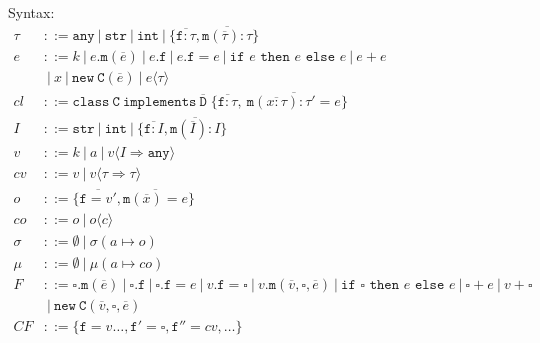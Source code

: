 \documentclass{report}
\begin{document}
\newcommand{\class}{\ensuremath{\xt{class}}\xspace}
\newcommand{\G}{\Gamma}
\renewcommand{\int}{\texttt{int}}
\newcommand{\coerce}{\Rightarrow} %
\newcommand{\str}{\texttt{str}}
\newcommand{\any}{\texttt{any}}   %
\newcommand{\this}{\texttt{this}}
\newcommand{\ifthenelse}[3]{\texttt{if }#1\texttt{ then }#2\texttt{ else }#3}
\newcommand{\cast}[1]{\langle #1\rangle} 
\newcommand{\xt}[1]{\texttt{#1}}
\newcommand{\creduce}{\longrightarrow_{cr}}  %
\newcommand{\ereduce}{\longrightarrow_{e}}   %
\newcommand{\stepsto}{\longrightarrow}        %
\newcommand{\intv}[1]{\xt{int}[#1]}
\newcommand{\strv}[1]{\xt{str}[#1]}
\newcommand{\tlate}{\rightsquigarrow}
\newcommand{\s}{\sigma}
\renewcommand{\sc}{\mu}
\renewcommand{\t}{\tau}
\newcommand{\B}{\ensuremath{~|~}\xspace}
\newcommand{\new}{\ensuremath{\texttt{new}}\xspace}
\newcommand{\NEW}[2]{\ensuremath{  \new ~ #1 ( #2 )}\xspace}
\renewcommand{\bar}[1]{\ensuremath{\overline{ #1} }\xspace}
\newcommand{\m}{\ensuremath{\xt{m}}\xspace}
\newcommand{\f}{\ensuremath{\xt{f}}\xspace}
\newcommand{\C}{\ensuremath{\xt{C}}\xspace}
\newcommand{\D}{\ensuremath{\xt{D}}\xspace}
\newcommand{\is}{\mapsto}
\newcommand{\cl}{\mathit{cl}\xspace}
\newcommand{\implements}{\xt{implements}\xspace}
\newcommand{\CLASS}[3]{ \ensuremath{  \xt{class}~#1~\implements~#2\;\{ #3 \}}\xspace} 
\newcommand{\MDEF}[4] { #1( #2 ):#3 = #4}
\newcommand{\MTYPE}[3] { #1( #2 ):#3}
\newcommand{\MVAL}[3] { #1( #2 ) = #3}
\newcommand{\Gdash}{\G\vdash}

Syntax:
\begin{align*}
\t &::= \any \B  \str \B  \int \B  \{\bar{\f :\t},\bar{\m (\bar{\t}):\t}\}\\
e &::= k \B  e.\m(\bar{e}) \B e.\f  \B e.\f  = e \B  \ifthenelse{e}{e}{e}\B e + e \\
&\B x\B \NEW \C {\bar{e}} \B  e\cast{\t}\\
\cl &::= \CLASS \C {\bar \D} { \bar{ \f : \t }, ~ \bar{ \MDEF{\m}{\bar{x :\t}}{\t'}{e} } } \\
I &::= \str \B  \int \B  \{\bar{\f :I},\bar{\m (\bar{I}):I}\}\\
v &::= k \B a \B  v\cast{I \coerce \any}\\
cv &::= v \B  v\cast{\t \coerce \t}\\
\mathit{o} &::= \{\bar{\f=v'}, \bar{\m(\bar x) = e}\}\\
\mathit{co} &::= o \B o\cast{c}\\
\s &::= \emptyset \B  \s( a \is o )\\
\sc &::= \emptyset \B  \sc( a \is  co )\\
F &::=    \square.\m(\bar e) 
   \B 	  \square.\f 
   \B 	  \square.\f  = e
   \B     v.\f  = \square
   \B     v.\m(\bar v,\square, \bar e) 
   \B     \ifthenelse{\square}{e}{e} 
   \B     \square + e 
   \B      v + \square\\
&\B \NEW  \C {\bar{v},\square,\bar{e}}\\
\mathit{CF} &::= \{\f=v\ldots,\f'=\square,\f''=cv,\ldots\}\\
\end{align*}
\end{document}
